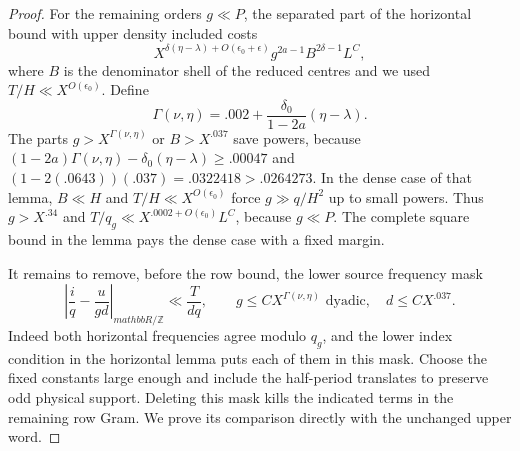 \documentclass[11pt,a4paper]{article}
\theoremstyle{paperplain}
\numberwithin{equation}{section}
\begin{document}
\begin{proof}
For the remaining orders $g\ll P$, the separated part
of the horizontal bound with upper density included costs
\[
 X^{\delta(\eta-\lambda)+O(\epsilon_0+\epsilon)}
                   g^{2a-1} B^{2\delta-1}L^C,
\]
where $B$ is the denominator shell of the reduced centres
and we used $T/H\ll X^{O(\epsilon_0)}$. Define
\begin{equation}\label{eq:near-balanced-order-cutoff}
     \Gamma(\nu,\eta)=.002+\frac{\delta_0}{1-2a}(\eta-\lambda).
\end{equation}
The parts $g>X^{\Gamma(\nu,\eta)}$ or $B>X^{.037}$ save
powers, because
$(1-2a)\Gamma(\nu,\eta)-\delta_0(\eta-\lambda)\ge.00047$ and
$(1-2(.0643))(.037)=.0322418>.0264273$.
In the dense case of that lemma, $B\ll H$ and $T/H\ll
X^{O(\epsilon_0)}$ force $g\gg q/H^2$ up to small powers.
Thus $g>X^{.34}$ and $T/q_g\ll X^{.0002+O(\epsilon_0)}L^C$,
because $g\ll P$. The complete square bound in the lemma
pays the dense case with a fixed margin.

It remains to remove, before the row bound, the lower source
frequency mask
\begin{equation}\label{eq:near-balanced-lower-band}
 \left|\frac{i}{q}-\frac{u}{gd}\right|_{mathbb R/\mathbb Z}
        \ll \frac{T}{dq},\qquad
               g\le C X^{\Gamma(\nu,\eta)}\text{ dyadic},\quad
               d\le C X^{.037}.
\end{equation}
Indeed both horizontal frequencies agree modulo $q_g$, and
the lower index condition in the horizontal lemma puts each
of them in this mask. Choose the fixed constants large
enough and include the half-period translates to preserve
odd physical support. Deleting this mask kills the indicated
terms in the remaining row Gram. We prove its comparison
directly with the unchanged upper word.


\end{proof}
\end{document}

